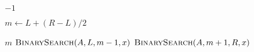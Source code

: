 
\begin{algorithm}[H]
  \begin{algorithmic}[1]
	\State \Return $-1$
      \EndIf

      \hStatex
      \State $m \gets L + (R - L) / 2$

      \hStatex
	\State \Return $m$
	\State \Return $\Call{BinarySearch}{A, L, m-1, x}$
      \Else
	\State \Return $\Call{BinarySearch}{A, m+1, R, x}$
      \EndIf
    \EndProcedure
  \end{algorithmic}
\end{algorithm}
